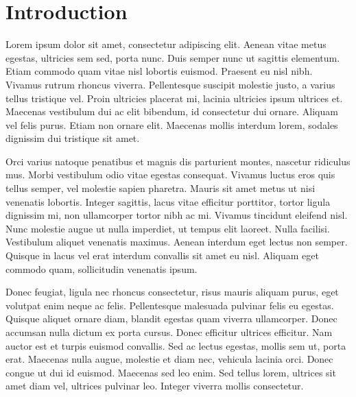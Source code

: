 \section{Introduction}
Lorem ipsum dolor sit amet, consectetur adipiscing elit. Aenean vitae metus egestas, ultricies sem sed, porta nunc. Duis semper nunc ut sagittis elementum. Etiam commodo quam vitae nisl lobortis euismod. Praesent eu nisl nibh. Vivamus rutrum rhoncus viverra. Pellentesque suscipit molestie justo, a varius tellus tristique vel. Proin ultricies placerat mi, lacinia ultricies ipsum ultrices et. Maecenas vestibulum dui ac elit bibendum, id consectetur dui ornare. Aliquam vel felis purus. Etiam non ornare elit. Maecenas mollis interdum lorem, sodales dignissim dui tristique sit amet.

Orci varius natoque penatibus et magnis dis parturient montes, nascetur ridiculus mus. Morbi vestibulum odio vitae egestas consequat. Vivamus luctus eros quis tellus semper, vel molestie sapien pharetra. Mauris sit amet metus ut nisi venenatis lobortis. Integer sagittis, lacus vitae efficitur porttitor, tortor ligula dignissim mi, non ullamcorper tortor nibh ac mi. Vivamus tincidunt eleifend nisl. Nunc molestie augue ut nulla imperdiet, ut tempus elit laoreet. Nulla facilisi. Vestibulum aliquet venenatis maximus. Aenean interdum eget lectus non semper. Quisque in lacus vel erat interdum convallis sit amet eu nisl. Aliquam eget commodo quam, sollicitudin venenatis ipsum.

Donec feugiat, ligula nec rhoncus consectetur, risus mauris aliquam purus, eget volutpat enim neque ac felis. Pellentesque malesuada pulvinar felis eu egestas. Quisque aliquet ornare diam, blandit egestas quam viverra ullamcorper. Donec accumsan nulla dictum ex porta cursus. Donec efficitur ultrices efficitur. Nam auctor est et turpis euismod convallis. Sed ac lectus egestas, mollis sem ut, porta erat. Maecenas nulla augue, molestie et diam nec, vehicula lacinia orci. Donec congue ut dui id euismod. Maecenas sed leo enim. Sed tellus lorem, ultrices sit amet diam vel, ultrices pulvinar leo. Integer viverra mollis consectetur.


